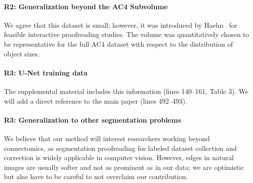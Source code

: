 \documentclass[10pt,twocolumn,letterpaper]{article}
\newcommand{\JT}[1]{\textcolor{red}{[JT: #1]}}
\begin{document}
\paragraph{R2: Generalization beyond the AC4 Subvolume} We agree that this dataset is small; however, it was introduced by Haehn~ for feasible interactive proofreading studies. The volume was quantitatively chosen to be representative for the full AC4 dataset with respect to the distribution of object sizes.

\paragraph{R3: U-Net training data} The supplemental material includes this information (lines 140--161, Table 3). We will add a direct reference to the main paper (lines 492--493).

\paragraph{R3: Generalization to other segmentation problems} 
We believe that our method will interest researchers working beyond connectomics, as segmentation proofreading for labeled dataset collection and correction is widely applicable in computer vision. However, edges in natural images are usually softer and not as prominent as in our data; we are optimistic but also have to be careful to not overclaim our contribution.

\end{document}
